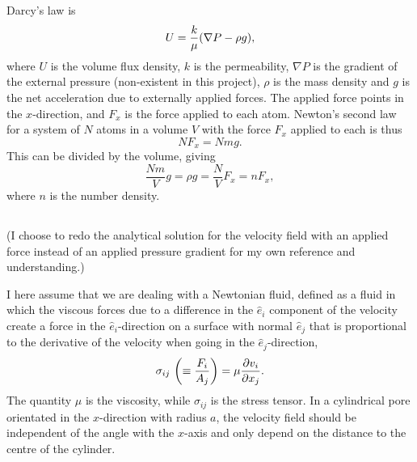 \documentclass[11pt,british,a4paper]{report}
\begin{document}
\subsection{}
Darcy's law is
\begin{equation}
    U = \frac{k}{\mu}\qty(\nabla P - \rho g),
\end{equation}
where \(U\) is the volume flux density, \(k\) is the permeability, \(\nabla P\) is the gradient of the external pressure (non-existent in this project), \(\rho\) is the mass density and \(g\) is the net acceleration due to externally applied forces. The applied force points in the \(x\)-direction, and \(F_x\) is the force applied to each atom. Newton's second law for a system of \(N\) atoms in a volume \(V\) with the force \(F_x\) applied to each is thus
\begin{equation}
    NF_x = Nmg.
\end{equation}
This can be divided by the volume, giving
\begin{equation}
    \frac{Nm}{V}g = \rho g = \frac{N}{V}F_x = nF_x,
\end{equation}
where \(n\) is the number density.

\subsection{}
(I choose to redo the analytical solution for the velocity field with an applied force instead of an applied pressure gradient for my own reference and understanding.)

I here assume that we are dealing with a Newtonian fluid, defined as a fluid in which the viscous forces due to a difference in the \(\hat{e}_i\) component of the velocity create a force in the \(\hat{e}_i\)-direction on a surface with normal \(\hat{e}_j\) that is proportional to the derivative of the velocity when going in the \(\hat{e}_j\)-direction,
\begin{equation}
    \sigma_{ij}\ \qty(\equiv \frac{F_i}{A_j}) = \mu \pdv{v_i}{x_j}.\label{eq:newtfluid}
\end{equation}
The quantity \(\mu\) is the viscosity, while \(\sigma_{ij}\) is the stress tensor. In a cylindrical pore orientated in the \(x\)-direction with radius \(a\), the velocity field should be independent of the angle with the \(x\)-axis and only depend on the distance to the centre of the cylinder.
\end{document}
